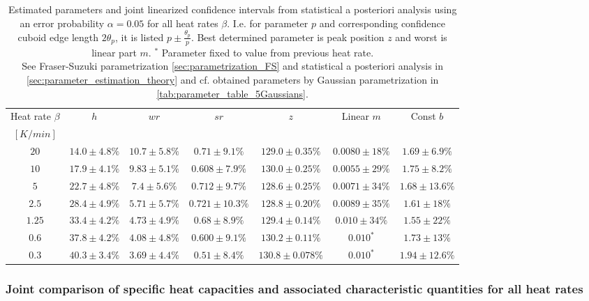 \documentclass{scrartcl}[12pt, halfparskip]
\numberwithin{equation}{section}
\numberwithin{figure}{section}
\numberwithin{table}{section}
\begin{document}
\begin{table}[H]
	\caption{Estimated parameters and joint linearized confidence intervals from statistical a posteriori analysis using an error probability $\alpha=0.05$ for all heat rates $\beta$. 
	I.e. for parameter $p$ and corresponding confidence cuboid edge length $2\theta_p$, it is listed $p \pm \frac{\theta_p}{p}$.
	Best determined parameter is  peak position $z$ and worst is linear part $m$.  $^*$ Parameter fixed to value from previous heat rate. \\
	See Fraser-Suzuki parametrization \cref{sec:parametrization_FS} and statistical a posteriori analysis in \cref{sec:parameter_estimation_theory} and cf. obtained parameters by Gaussian parametrization in \cref{tab:parameter_table_5Gaussians}.}
	\hspace{-1.6cm}
	\begin{tabular}{| c | c | c | c | c | c | c |} \hline
		Heat rate $\beta$ & $h$ & $wr$ & $sr$ & $z$ & Linear $m$ & Const $b$ \\ 
		$[K/min]$ & & & & & & \\ \hline
		$20$ & $14.0 \pm 4.8\%$ & $10.7 \pm 5.8\%$ & $0.71 \pm 9.1\%$ & $129.0 \pm 0.35\%$ & $0.0080 \pm 18\%$ & $1.69 \pm 6.9\%$ \\
		$10$ & $17.9 \pm 4.1\%$ & $9.83 \pm 5.1\%$ & $0.608 \pm 7.9\%$ & $130.0 \pm 0.25\%$ & $0.0055 \pm 29\%$ & $1.75 \pm 8.2\%$  \\
		$5$ & $22.7 \pm 4.8\%$ & $7.4 \pm 5.6\%$ & $0.712 \pm 9.7\%$ & $128.6 \pm 0.25\%$ & $0.0071 \pm 34\%$ & $1.68 \pm 13.6\%$ \\
		$2.5$ & $28.4 \pm 4.9\%$ & $5.71 \pm 5.7\%$ & $0.721 \pm 10.3\%$ & $128.8 \pm 0.20\%$ & $0.0089 \pm 35\%$ & $1.61 \pm 18\%$ \\
		$1.25$ & $33.4 \pm 4.2\%$ & $4.73 \pm 4.9\%$ & $0.68 \pm 8.9\%$ & $129.4 \pm 0.14\%$ & $0.010 \pm 34\%$ & $1.55 \pm 22\%$ \\
		$0.6$ & $37.8 \pm 4.2\%$ & $4.08 \pm 4.8\%$ & $0.600 \pm 9.1\%$ & $130.2 \pm 0.11\%$ & $0.010^*$ & $1.73 \pm 13\%$ \\
		$0.3$ & $40.3 \pm 3.4\%$ & $3.69 \pm 4.4\%$ & $0.51 \pm 8.4\%$ & $130.8 \pm 0.078\%$ & $0.010^*$ & $1.94 \pm 12.6\%$ \\ \hline
	\end{tabular}
	\label{tab:parameter_table_FS}
\end{table}

\subsubsection{Joint comparison of specific heat capacities and associated characteristic quantities for all heat rates}
\end{document}
